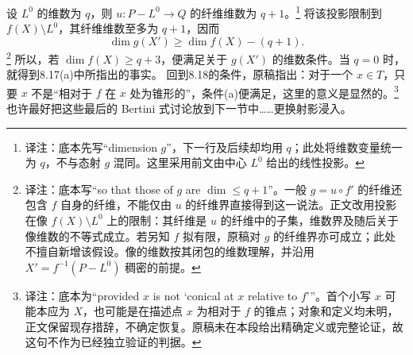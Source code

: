 \documentclass[openany]{ctexbook}
\newcommand{\note}[1]{\footnote{译注：#1}}
\begin{document}
设 $L^0$ 的维数为 $q$，则 $u:P-L^0\to Q$ 的纤维维数为 $q+1$。\note{底本先写“dimension $g$”，下一行及后续却均用 $q$；此处将维数变量统一为 $q$，不与态射 $g$ 混同。这里采用前文由中心 $L^0$ 给出的线性投影。}
将该投影限制到 $f(X)\setminus L^0$，其纤维维数至多为 $q+1$，因而
\[
\dim g(X')\ge \dim f(X)-(q+1).
\]
\note{底本写“so that those of $g$ are $\dim\le q+1$”。一般 $g=u\circ f'$ 的纤维还包含 $f$ 自身的纤维，不能仅由 $u$ 的纤维界直接得到这一说法。正文改用投影在像 $f(X)\setminus L^0$ 上的限制：其纤维是 $u$ 的纤维中的子集，维数界及随后关于像维数的不等式成立。若另知 $f$ 拟有限，原稿对 $g$ 的纤维界亦可成立；此处不擅自新增该假设。像的维数按其闭包的维数理解，并沿用 $X'=f^{-1}(P-L^0)$ 稠密的前提。}
所以，若 $\dim f(X)\ge q+3$，便满足关于 $g(X')$ 的维数条件。当 $q=0$ 时，就得到8.17(a)中所指出的事实。
回到8.18的条件，原稿指出：对于一个 $x\in T$，只要 $x$ 不是“相对于 $f$ 在 $x$ 处为锥形的”，条件(a)便满足，这里的意义是显然的。\note{底本为“provided $x$ is not ‘conical at $x$ relative to $f$’”。首个小写 $x$ 可能本应为 $X$，也可能是在描述点 $x$ 为相对于 $f$ 的锥点；对象和定义均未明，正文保留现存措辞，不确定恢复。原稿未在本段给出精确定义或完整论证，故这句不作为已经独立验证的判据。}
也许最好把这些最后的 Bertini 式讨论放到下一节中……更换射影浸入。
\end{document}
